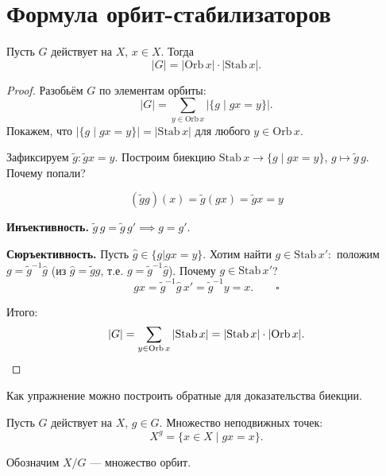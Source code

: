 \section{Формула орбит-стабилизаторов}

\begin{stmt}
    Пусть $G$ действует на $X$, $x \in X$. Тогда
    \[
        |G| = |\mathrm{Orb}\, x| \cdot |\mathrm{Stab}\, x|.
    \]
    \begin{proof}
        Разобьём $G$ по элементам орбиты:
        \[
            |G| = \sum_{y \in \mathrm{Orb}\, x} |\{g \mid gx = y\}|.
        \]
        Покажем, что $|\{g \mid gx = y\}| = |\mathrm{Stab}\, x|$ для любого $y \in \mathrm{Orb}\, x$.

        Зафиксируем $\tilde{g}\colon \tilde{g}x = y$. Построим биекцию $\mathrm{Stab}\, x \to \{g \mid gx = y\}$,
        $g \mapsto \tilde{g}\, g$.
        Почему попали?

        \[
            (\tilde{g} g)(x) = \tilde{g}(gx) = \tilde{g}x = y
        \]

        \textbf{Инъективность.} $\tilde{g}\, g = \tilde{g}\, g' \implies g = g'$.

        \textbf{Сюръективность.} Пусть $\hat{g} \in \{g | gx = y\}$.
        Хотим найти $g \in \mathrm{Stab}\, x'\colon$ положим $g = \tilde{g}^{-1}\hat{g}$
        (из $\hat{g} = \tilde{g}g$, т.е. $g = \tilde{g}^{-1}\hat{g}$).
        Почему $g \in \mathrm{Stab}\, x'$?
        \[
            gx = \tilde{g}^{-1}\hat{g}\, x' = \tilde{g}^{-1} y = x. \qquad \square
        \]

        Итого:
        \[
            |G| = \sum_{y \in \mathrm{Orb}\, x} |\mathrm{Stab}\, x| = |\mathrm{Stab}\, x| \cdot |\mathrm{Orb}
            \, x|. \qedhere
        \]
    \end{proof}
\end{stmt}


\begin{remark}
    Как упражнение можно построить обратные для доказательства биекции.
\end{remark}



\begin{definition}
    Пусть $G$ действует на $X$, $g \in G$. Множество неподвижных точек:
    \[
        X^g = \{x \in X \mid gx = x\}.
    \]
\end{definition}

\begin{definition}
Обозначим $X / G$ --- множество орбит.
\end{definition}

